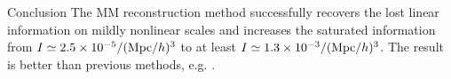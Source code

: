\begin{section}{Conclusion}
  \label{sec:conclusion}
  The MM reconstruction method successfully recovers the lost linear
  information on mildly nonlinear scales and increases the saturated
  information from $I \simeq 2.5 \times 10^{-5}/({\rm Mpc}/h)^3$
  to at least $I \simeq 1.3 \times 10^{-3}/({\rm Mpc}/h)^3$.  The result is
  better than previous methods,
  e.g. \cite{bib:Mark2006,bib:Mark2009,bib:Zhang2011,bib:Yu2012}.

\end{section}
